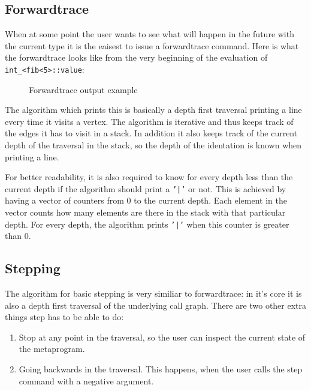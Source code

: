 \subsection{Forwardtrace}

When at some point the user wants to see what will happen in the future with
the current type it is the eaisest to issue a forwardtrace command. Here is
what the forwardtrace looks like from the very beginning of the evaluation of
\texttt{int\_<fib<5>::value}:

\bigskip

\begin{figure}[H]
    
    \caption{Forwardtrace output example}
\end{figure}

\noindent
The algorithm which prints this is basically a depth first traversal printing
a line every time it visits a vertex. The algorithm is iterative and thus keeps
track of the edges it has to visit in a stack. In addition it also keeps track
of the current depth of the traversal in the stack, so the depth of the
identation is known when printing a line.

For better readability, it is also required to know for every depth less than
the current depth if the algorithm should print a \texttt{'|'} or not. This
is achieved by having a vector of counters from 0 to the current depth. Each
element in the vector counts how many elements are there in the stack with that
particular depth. For every depth, the algorithm prints \texttt{'|'} when
this counter is greater than 0.

\subsection{Stepping}

The algorithm for basic stepping is very similiar to forwardtrace: in it's core
it is also a depth first traversal of the underlying call graph. There are two
other extra things step has to be able to do:

\begin{enumerate}
    \item
        Stop at any point in the traversal, so the user can inspect the current
        state of the metaprogram.
    \item
        Going backwards in the traversal. This happens, when the user calls the
        step command with a negative argument.
\end{enumerate}

